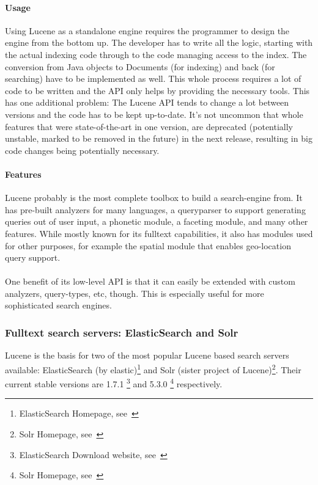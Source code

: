 \pagebreak

\paragraph{Usage}
Using Lucene as a standalone engine requires the programmer to design the engine from the bottom up. The developer has to write all the logic, starting with the actual indexing code through to the code managing access to the index. The conversion from Java objects to Documents (for indexing) and back (for searching) have to be implemented as well. This whole process requires a lot of code to be written and the API only helps by providing the necessary tools. This has one additional problem: The Lucene API tends to change a lot between versions and the code has to be kept up-to-date. It's not uncommon that whole features that were state-of-the-art in one version, are deprecated (potentially unstable, marked to be removed in the future) in the next release, resulting in big code changes being potentially necessary.

\paragraph{Features}
Lucene probably is the most complete toolbox to build a search-engine from. It has pre-built analyzers for many languages, a queryparser to support generating queries out of user input, a phonetic module, a faceting module, and many other features. While mostly known for its fulltext capabilities, it also has modules used for other purposes, for example the spatial module that enables geo-location query support.
\\\\
One benefit of its low-level API is that it can easily be extended with custom analyzers, query-types, etc, though. This is especially useful for more sophisticated search engines.

\pagebreak

\subsubsection{Fulltext search servers: ElasticSearch and Solr}
Lucene is the basis for two of the most popular Lucene based search servers available: ElasticSearch (by elastic)\footnote{ElasticSearch Homepage, see~\cite{elasticsearch_homepage}} and Solr (sister project of Lucene)\footnote{Solr Homepage, see~\cite{solr_homepage}}. Their current stable versions are 1.7.1 \footnote{ElasticSearch Download website, see~\cite{elasticsearch_downloads_website}} and 5.3.0 \footnote{Solr Homepage, see~\cite{solr_homepage}} respectively.

